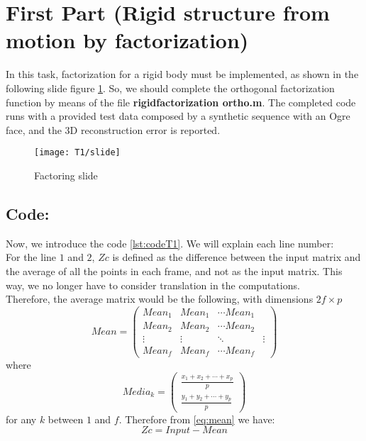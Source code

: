 \section{First Part (Rigid structure from motion by factorization)}
\noindent In this task, factorization for a rigid body must be implemented, as shown in the following slide figure \ref{fig:slideT1}.
\noindent So, we should complete the orthogonal factorization function by means of the file \textbf{rigidfactorization ortho.m}. The completed code runs with a provided test data composed by a synthetic sequence with an Ogre face, and the 3D reconstruction error is reported.\\

\begin{figure}[h]
    \centering
    \texttt{[image: T1/slide]}
    \caption{Factoring slide}
    \label{fig:slideT1}
\end{figure}

\subsection{Code:}
\noindent Now, we introduce the code \ref{lst:codeT1}. We will explain each line number:\\ 
\noindent For the line $1$ and $2$, $Zc$ is defined as the difference between the input matrix and the average of all the points in each frame, and not as the input matrix.
This way, we no longer have to consider translation in the computations.\\ 
\noindent Therefore, the average matrix would be the following, with dimensions $2f\times p$
\begin{equation}\label{eq:mean}
Mean=
\begin{pmatrix}
Mean_{1} & Mean_{1} & \cdots Mean_{1}\\
Mean_{2} & Mean_{2} & \cdots Mean_{2}\\
\vdots & \vdots & \ddots & \vdots\\
Mean_{f} & Mean_{f} & \cdots Mean_{f}
\end{pmatrix}
\end{equation}
\noindent where
\begin{equation}
Media_{k}=
\begin{pmatrix}
\frac{x_{1} + x_{2} + \cdots + x_{p}}{p}\\
\frac{y_{1} + y_{2} + \cdots + y_{p}}{p}
\end{pmatrix}
\end{equation}
\noindent for any $k$ between $1$ and $f$.
\noindent Therefore from \ref{eq:mean} we have:
\begin{equation}
Zc=Input-Mean
\end{equation}

